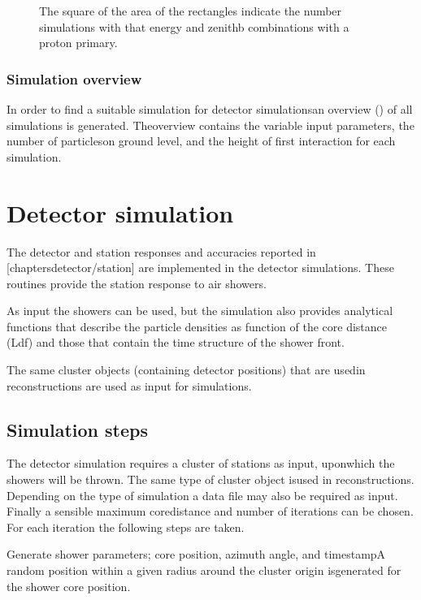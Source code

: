 \begin{figure}
    \centering
    
    \caption{ The square of the area of the rectangles indicate the number simulations with that energy and zenithb combinations with a proton primary.}
    \label{fig:simulations_proton_energy_zenith}
\end{figure}


\subsubsection{Simulation overview}

In order to find a suitable \corsika simulation for detector simulationsan overview (\hdf) of all \corsika simulations is generated. Theoverview contains the variable input parameters, the number of particleson ground level, and the height of first interaction for each simulation.


\section{Detector simulation}

The detector and station responses and accuracies reported in [chaptersdetector/station] are implemented in the detector simulations. These routines provide the station response to air showers.

As input the \corsika showers can be used, but the simulation also provides analytical functions that describe the particle densities as function of the core distance (Ldf) and those that contain the time structure of the shower front.

The same cluster objects (containing detector positions) that are usedin reconstructions are used as input for simulations.


\subsection{Simulation steps}

The detector simulation requires a cluster of stations as input, uponwhich the showers will be thrown. The same type of cluster object isused in reconstructions. Depending on the type of simulation a \corsika data file may also be required as input. Finally a sensible maximum coredistance and number of iterations can be chosen. For each iteration the following steps are taken.

Generate shower parameters; core position, azimuth angle, and timestampA random position within a given radius around the cluster origin isgenerated for the shower core position.

